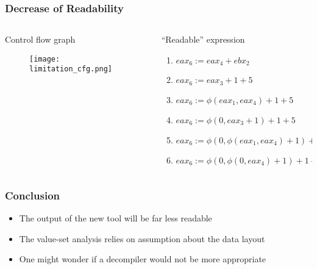 \documentclass[10pt, xcolor={dvipsnames}]{beamer}
\begin{document}
\begin{frame}
	\frametitle{Decrease of Readability}
		\begin{columns}[T] %
			\begin{column}{.42\textwidth}
				\begin{block}{Control flow graph}
					\begin{figure}
						\centering
						\texttt{[image: limitation\_cfg.png]}
					\end{figure}
				\end{block}
			\end{column}%
			\hfill%
			\begin{column}{.54\textwidth}
				\begin{block}{“Readable” expression}
					\begin{enumerate}
						\item $eax_6 := eax_4 + ebx_2$
						\item $eax_6 := eax_3 + 1 + 5$
						\item $eax_6 := \phi(eax_1, eax_4) + 1 + 5$
						\item $eax_6 := \phi(0, eax_3 + 1) + 1 + 5$
						\item $eax_6 := \phi(0, \phi(eax_1, eax_4) + 1) + 1 + 5$
						\item $eax_6 := \phi(0, \phi(0, eax_4) + 1) + 1 + 5$
					\end{enumerate}
				\end{block}
			\end{column}%
		\end{columns}
\end{frame}

\begin{frame}
	\frametitle{Conclusion}
	\begin{block}{}
		\begin{itemize}
			\item The output of the new tool will be far less readable
			\item The value-set analysis relies on assumption about the data layout
			\item One might wonder if a decompiler would not be more appropriate
		\end{itemize}
	\end{block}
\end{frame}
\end{document}
